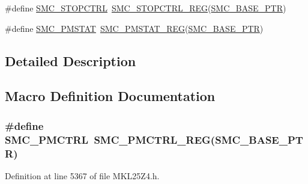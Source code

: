 \begin{DoxyCompactItemize}
\#define \hyperlink{group___s_m_c___register___accessor___macros_ga30413a73d6f7e296acd7d1857ebf213e}{S\+M\+C\+\_\+\+S\+T\+O\+P\+C\+T\+RL}~\hyperlink{group___s_m_c___register___accessor___macros_gaa5acb017ede815ab56f09a505bc276c2}{S\+M\+C\+\_\+\+S\+T\+O\+P\+C\+T\+R\+L\+\_\+\+R\+EG}(\hyperlink{group___s_m_c___peripheral_ga31b6c4571795341e6446800243313e56}{S\+M\+C\+\_\+\+B\+A\+S\+E\+\_\+\+P\+TR})
\item 
\#define \hyperlink{group___s_m_c___register___accessor___macros_ga6311e0572e3a1f7d84e1069716b64307}{S\+M\+C\+\_\+\+P\+M\+S\+T\+AT}~\hyperlink{group___s_m_c___register___accessor___macros_ga77ded725e1d8ccc2781a0ee6dffc8809}{S\+M\+C\+\_\+\+P\+M\+S\+T\+A\+T\+\_\+\+R\+EG}(\hyperlink{group___s_m_c___peripheral_ga31b6c4571795341e6446800243313e56}{S\+M\+C\+\_\+\+B\+A\+S\+E\+\_\+\+P\+TR})
\end{DoxyCompactItemize}


\subsection{Detailed Description}


\subsection{Macro Definition Documentation}
\subsubsection[{\texorpdfstring{S\+M\+C\+\_\+\+P\+M\+C\+T\+RL}{SMC_PMCTRL}}]{\setlength{\rightskip}{0pt plus 5cm}\#define S\+M\+C\+\_\+\+P\+M\+C\+T\+RL~{\bf S\+M\+C\+\_\+\+P\+M\+C\+T\+R\+L\+\_\+\+R\+EG}({\bf S\+M\+C\+\_\+\+B\+A\+S\+E\+\_\+\+P\+TR})}\hypertarget{group___s_m_c___register___accessor___macros_ga4b2bae0309aecee21e9fe70ac7dbe3dc}{}\label{group___s_m_c___register___accessor___macros_ga4b2bae0309aecee21e9fe70ac7dbe3dc}


Definition at line 5367 of file M\+K\+L25\+Z4.\+h.

